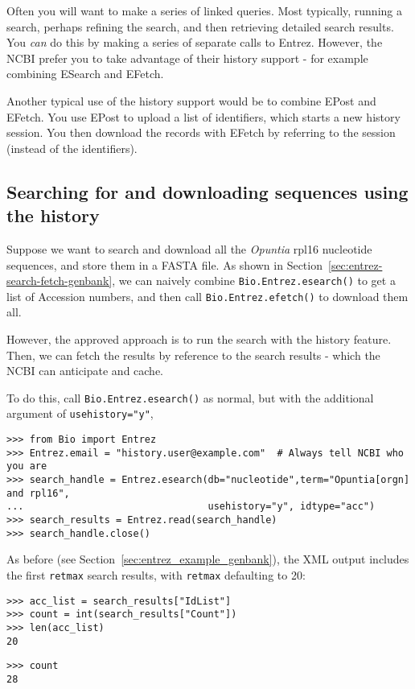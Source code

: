 Often you will want to make a series of linked queries.  Most typically,
running a search, perhaps refining the search, and then retrieving detailed
search results.  You \emph{can} do this by making a series of separate calls
to Entrez.  However, the NCBI prefer you to take advantage of their history
support - for example combining ESearch and EFetch.

Another typical use of the history support would be to combine EPost and
EFetch.  You use EPost to upload a list of identifiers, which starts a new
history session.  You then download the records with EFetch by referring
to the session (instead of the identifiers).

\subsection{Searching for and downloading sequences using the history}
Suppose we want to search and download all the \textit{Opuntia} rpl16
nucleotide sequences, and store them in a FASTA file.  As shown in
Section~\ref{sec:entrez-search-fetch-genbank}, we can naively combine
\verb|Bio.Entrez.esearch()| to get a list of Accession numbers, and then call
\verb|Bio.Entrez.efetch()| to download them all.

However, the approved approach is to run the search with the history
feature.  Then, we can fetch the results by reference to the search
results - which the NCBI can anticipate and cache.

To do this, call \verb|Bio.Entrez.esearch()| as normal, but with the
additional argument of \verb|usehistory="y"|,

\begin{verbatim}
>>> from Bio import Entrez
>>> Entrez.email = "history.user@example.com"  # Always tell NCBI who you are
>>> search_handle = Entrez.esearch(db="nucleotide",term="Opuntia[orgn] and rpl16",
...                                usehistory="y", idtype="acc")
>>> search_results = Entrez.read(search_handle)
>>> search_handle.close()
\end{verbatim}

\noindent As before (see Section~\ref{sec:entrez_example_genbank}), the XML output includes the first \verb+retmax+ search results, with \verb+retmax+ defaulting to 20:

\begin{verbatim}
>>> acc_list = search_results["IdList"]
>>> count = int(search_results["Count"])
>>> len(acc_list)
20
\end{verbatim}
\begin{verbatim}
>>> count
28
\end{verbatim}

